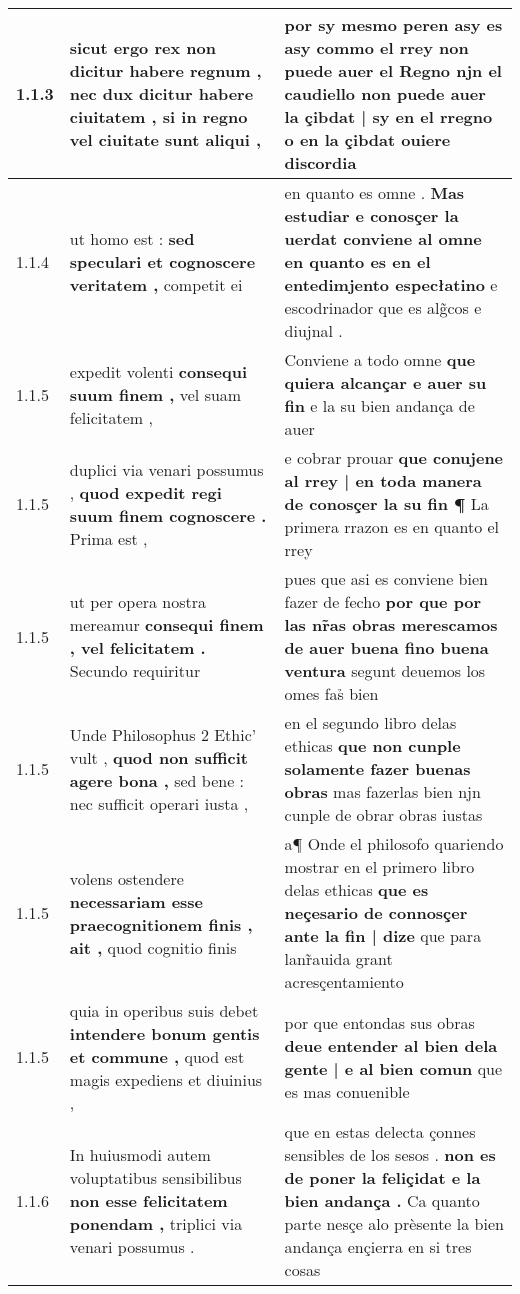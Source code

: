 \begin{tabular}{|p{1cm}|p{6.5cm}|p{6.5cm}|}
1.1.3 & sicut ergo rex non dicitur habere regnum , \textbf{ nec dux dicitur habere ciuitatem , } si in regno vel ciuitate sunt aliqui , & por sy mesmo peren asy es asy commo el rrey non puede auer el Regno \textbf{ njn el caudiello non puede auer la çibdat | sy en el rregno } o en la çibdat ouiere discordia \\\hline
1.1.4 & ut homo est : \textbf{ sed speculari et cognoscere veritatem , } competit ei & en quanto es omne . \textbf{ Mas estudiar e conosçer la uerdat conviene al omne en quanto es en el entedimjento especłatino } e escodrinador que es alg̃cos e diujnal . \\\hline
1.1.5 & expedit volenti \textbf{ consequi suum finem , } vel suam felicitatem , & Conviene a todo omne \textbf{ que quiera alcançar e auer su fin } e la su bien andança de auer \\\hline
1.1.5 & duplici via venari possumus , \textbf{ quod expedit regi suum finem cognoscere . } Prima est , & e cobrar prouar \textbf{ que conujene al rrey | en toda manera de conosçer la su fin ¶ } La primera rrazon es en quanto el rrey \\\hline
1.1.5 & ut per opera nostra mereamur \textbf{ consequi finem , vel felicitatem . } Secundo requiritur & pues que asi es conviene bien fazer de fecho \textbf{ por que por las nr̃as obras merescamos de auer buena fino buena ventura } segunt deuemos los omes fas̉ bien \\\hline
1.1.5 & Unde Philosophus 2 Ethic’ vult , \textbf{ quod non sufficit agere bona , } sed bene : nec sufficit operari iusta , & en el segundo libro delas ethicas \textbf{ que non cunple solamente fazer buenas obras } mas fazerlas bien njn cunple de obrar obras iustas \\\hline
1.1.5 & volens ostendere \textbf{ necessariam esse praecognitionem finis , ait , } quod cognitio finis & a¶ Onde el philosofo quariendo mostrar en el primero libro delas ethicas \textbf{ que es neçesario de connosçer ante la fin | dize } que para lanr̃auida grant acresçentamiento \\\hline
1.1.5 & quia in operibus suis debet \textbf{ intendere bonum gentis et commune , } quod est magis expediens et diuinius , & por que entondas sus obras \textbf{ deue entender al bien dela gente | e al bien comun } que es mas conuenible \\\hline
1.1.6 & In huiusmodi autem voluptatibus sensibilibus \textbf{ non esse felicitatem ponendam , } triplici via venari possumus . & que en estas delecta çonnes sensibles de los sesos . \textbf{ non es de poner la feliçidat e la bien andança . } Ca quanto parte nesçe alo prèsente la bien andança ençierra en si tres cosas \\\hline

\end{tabular}
